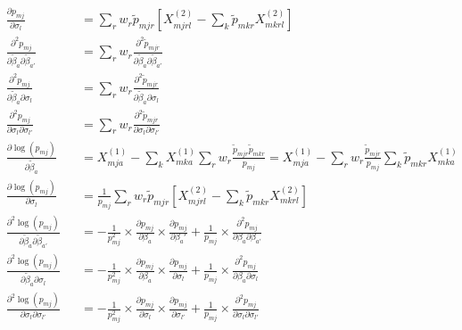 \documentclass[12pt]{article}
\begin{document}
\begin{equation}
\begin{aligned}
	& \frac{\partial p_{mj}}{\partial \sigma_l} && = \sum_r w_r \tilde{p}_{mjr} \left[ X_{mjrl}^{(2)} - \sum_k \tilde{p}_{mkr} X_{mkrl}^{(2)} \right] \\
	& \frac{\partial^2 p_{mj}}{\partial \tilde{\beta}_a \partial \tilde{\beta}_{a'}} && = \sum_r w_r  \frac{\partial^2 \tilde{p}_{mjr}}{\partial \tilde{\beta}_a \partial \tilde{\beta}_{a'}}  \\
	& \frac{\partial^2 p_{mj}}{\partial \tilde{\beta}_a \partial \sigma_l} && = \sum_r w_r  \frac{\partial^2 \tilde{p}_{mjr}}{\partial \tilde{\beta}_a \partial \sigma_l}  \\
	& \frac{\partial^2 p_{mj}}{\partial \sigma_l \partial \sigma_{l'}} && = \sum_r w_r  \frac{\partial^2 \tilde{p}_{mjr}}{\partial \sigma_l \partial \sigma_{l'}} \\
	& \frac{\partial \log(p_{mj})}{\partial \tilde{\beta}_a} && = X_{mja}^{(1)} - \sum_k X_{mka}^{(1)} \sum_r w_r \frac{\tilde{p}_{mjr} \tilde{p}_{mkr}}{p_{mj}} = X_{mja}^{(1)} - \sum_r w_r \frac{\tilde{p}_{mjr} }{p_{mj}} \sum_k \tilde{p}_{mkr} X_{mka}^{(1)}  \\
	& \frac{\partial \log(p_{mj})}{\partial \sigma_l} && = \frac{1}{p_{mj}} \sum_r w_r \tilde{p}_{mjr} \left[ X_{mjrl}^{(2)} - \sum_k \tilde{p}_{mkr} X_{mkrl}^{(2)} \right] \\
	& \frac{\partial^2 \log(p_{mj})}{\partial \tilde{\beta}_a \partial \tilde{\beta}_{a'}} && = - \frac{1}{p_{mj}^2} \times \frac{\partial p_{mj}}{\partial \beta_a} \times \frac{\partial p_{mj}}{\partial \beta_a'} + \frac{1}{p_{mj}} \times \frac{\partial^2 p_{mj}}{\partial \beta_a \partial \beta_{a'}}  \\
	& \frac{\partial^2 \log(p_{mj})}{\partial \tilde{\beta}_a \partial \sigma_l} && = - \frac{1}{p_{mj}^2} \times \frac{\partial p_{mj}}{\partial \beta_a} \times \frac{\partial p_{mj}}{\partial \sigma_l} + \frac{1}{p_{mj}} \times \frac{\partial^2 p_{mj}}{\partial \beta_a \partial \sigma_l}  \\
	& \frac{\partial^2 \log(p_{mj})}{\partial \sigma_l \partial \sigma_{l'}} && = - \frac{1}{p_{mj}^2} \times \frac{\partial p_{mj}}{\partial \sigma_l} \times \frac{\partial p_{mj}}{\partial \sigma_{l'}} + \frac{1}{p_{mj}} \times \frac{\partial^2 p_{mj}}{\partial \sigma_l \partial \sigma_{l'}}  \\
\end{aligned}
\end{equation}
\end{document}
